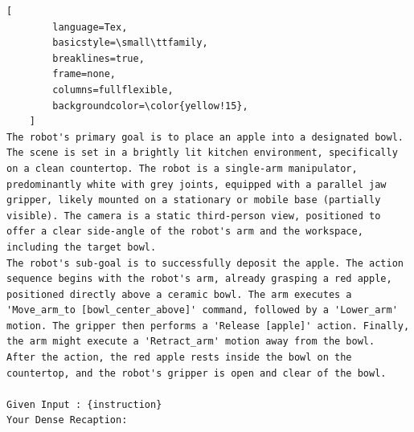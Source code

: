 \begin{tcolorbox}[
    promptstyle, 
    width=\linewidth, 
    breakable
]
\begin{lstlisting}[
        language=Tex, 
        basicstyle=\small\ttfamily,
        breaklines=true,
        frame=none, 
        columns=fullflexible,
        backgroundcolor=\color{yellow!15}, 
    ]
The robot's primary goal is to place an apple into a designated bowl.
The scene is set in a brightly lit kitchen environment, specifically on a clean countertop. The robot is a single-arm manipulator, predominantly white with grey joints, equipped with a parallel jaw gripper, likely mounted on a stationary or mobile base (partially visible). The camera is a static third-person view, positioned to offer a clear side-angle of the robot's arm and the workspace, including the target bowl.
The robot's sub-goal is to successfully deposit the apple. The action sequence begins with the robot's arm, already grasping a red apple, positioned directly above a ceramic bowl. The arm executes a 'Move_arm_to [bowl_center_above]' command, followed by a 'Lower_arm' motion. The gripper then performs a 'Release [apple]' action. Finally, the arm might execute a 'Retract_arm' motion away from the bowl.
After the action, the red apple rests inside the bowl on the countertop, and the robot's gripper is open and clear of the bowl.

Given Input : {instruction}
Your Dense Recaption:

    \end{lstlisting}
    
\end{tcolorbox}

\clearpage

